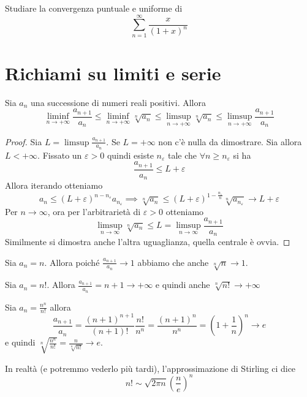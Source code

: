 \begin{example}
    Studiare la convergenza puntuale e uniforme di
    \[
        \sum_{n=1}^{\infty} \frac{x}{{(1+x)}^{n}} 
    \]
\end{example}

\section{Richiami su limiti e serie}
\begin{proposition}
    Sia \(a_{n}\) una successione di numeri reali positivi. Allora 
    \[
       \liminf_{n \to +\infty} \frac{a_{n+1}}{ a_{n} } \le \liminf_{n \to
       +\infty} \sqrt[n]{a_{n}} \le \limsup_{n \to +\infty} \sqrt[n]{a_{n}} \le
       \limsup_{n \to +\infty} \frac{a_{n+1}}{a_{n}}
    \]
\end{proposition}
\begin{proof}
    Sia \(L = \limsup \frac{a_{n+1}}{a_{n}}\). Se \(L=+\infty\) non c'è nulla da
    dimostrare. Sia allora \( L < +\infty\). Fissato un \(\varepsilon>0\) quindi
    esiste \(n_{\varepsilon} \) tale che \(\forall n \ge n_{\varepsilon}\) si ha 
    \[
        \frac{a_{n+1} }{a_{n}} \le  L + \varepsilon
    \]
    Allora iterando otteniamo
    \[
        a_{n} \le (L + \varepsilon)^{n - n_{\varepsilon}} a_{n_{\varepsilon}}
        \implies \sqrt[n]{a_{n}} \le {(L + \varepsilon)}^{1 -
        \frac{n_{\varepsilon}}{n}} \sqrt[n]{a_{n_{\varepsilon}}} \to L +
        \varepsilon 
    \]
    Per \(n \to \infty\), ora per l'arbitrarietà di \(\varepsilon > 0\)
    otteniamo
    \[
        \limsup_{n \to \infty} \sqrt[n]{a_{n}} \le L = \limsup_{n \to \infty}
        \frac{a_{n+1}}{a_{n}}
    \]
    Similmente si dimostra anche l'altra uguaglianza, quella centrale è ovvia.
\end{proof}
\begin{example}
    Sia \(a_{n} = n\). Allora poiché \(\frac{a_{n+1}}{a_{n}} \to 1\) abbiamo che
    anche \(\sqrt[n]{n} \to 1\).

    Sia \(a_{n} = n!\). Allora \(\frac{a_{n+1}}{a_{n}} = n+1 \to +\infty\) e
    quindi anche \(\sqrt[n]{n!} \to +\infty\)

    Sia \(a_{n} = \frac{n^{n}}{n!}\) allora
    \[
        \frac{a_{n+1}}{a_{n}} = \frac{{(n+1)}^{n+1}}{(n+1)!} \frac{n!}{n^{n}} =
        \frac{{(n+1)}^{n}}{n^{n}} = {\left( 1 + \frac{1}{n} \right)}^{n} \to e
    \]
    e quindi \(\displaystyle \sqrt[n]{\frac{n^{n}}{n!}} =
    \frac{n}{\sqrt[n]{n!}}\to e\).

\end{example}
\begin{remark}
    In realtà (e potremmo vederlo più tardi), l'approssimazione di Stirling ci
    dice
    \[
    n! \sim \sqrt{2\pi n} {\left( \frac{n}{e} \right)}^{n}
    \]
\end{remark}

